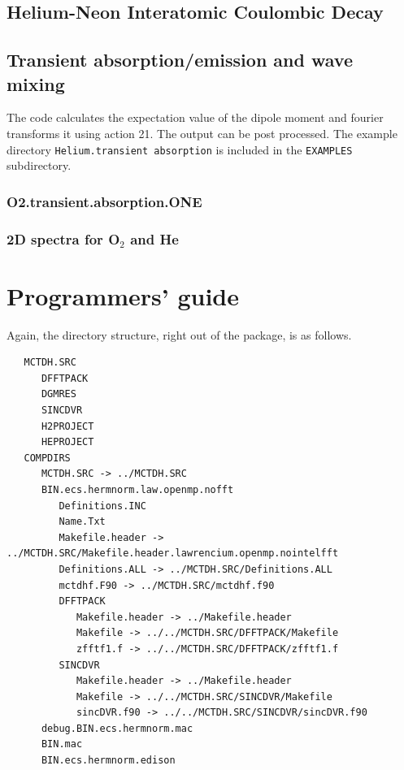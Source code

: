 \documentclass[10pt,leqno, oneside]{book}
\begin{document}
\section{Helium-Neon Interatomic Coulombic Decay}

\section{Transient absorption/emission and wave mixing}

The code calculates the expectation value of the dipole moment and fourier transforms it using action 21.  The output can be post
processed.  The example directory
\verb#Helium.transient absorption#
is included in the \verb#EXAMPLES# subdirectory.  

\subsection{O2.transient.absorption.ONE}

\subsection{2D spectra for O$_2$ and He}



\chapter{Programmers' guide}


Again, the directory structure, right out of the package, is as follows. 

{\footnotesize
\begin{verbatim}
   MCTDH.SRC
      DFFTPACK
      DGMRES
      SINCDVR
      H2PROJECT
      HEPROJECT
   COMPDIRS
      MCTDH.SRC -> ../MCTDH.SRC
      BIN.ecs.hermnorm.law.openmp.nofft
         Definitions.INC
         Name.Txt
         Makefile.header -> ../MCTDH.SRC/Makefile.header.lawrencium.openmp.nointelfft
         Definitions.ALL -> ../MCTDH.SRC/Definitions.ALL
         mctdhf.F90 -> ../MCTDH.SRC/mctdhf.f90
         DFFTPACK
            Makefile.header -> ../Makefile.header
            Makefile -> ../../MCTDH.SRC/DFFTPACK/Makefile
            zfftf1.f -> ../../MCTDH.SRC/DFFTPACK/zfftf1.f
         SINCDVR
            Makefile.header -> ../Makefile.header
            Makefile -> ../../MCTDH.SRC/SINCDVR/Makefile
            sincDVR.f90 -> ../../MCTDH.SRC/SINCDVR/sincDVR.f90
      debug.BIN.ecs.hermnorm.mac
      BIN.mac
      BIN.ecs.hermnorm.edison
\end{verbatim}}
\end{document}
